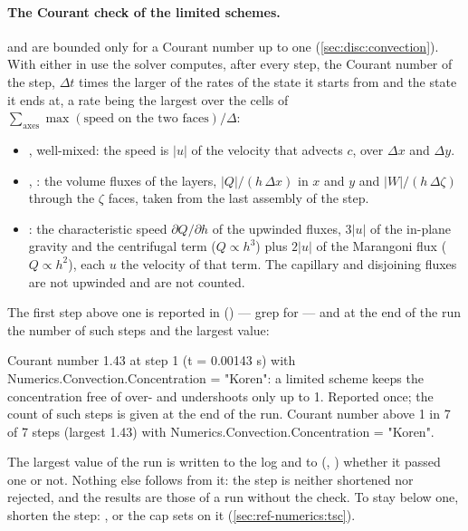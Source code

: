 \paragraph{The Courant check of the limited schemes.}  and
 are bounded only for a Courant number up to one
(\cref{sec:disc:convection}). With either in use the solver computes, after
every step, the Courant number of the step, $\Delta t$ times the larger of
the rates of the state it starts from and the state it ends at, a rate being the
largest over the cells of $\sum_\text{axes} \max(\text{speed on the two
faces})/\Delta$:
\begin{itemize}
  \item {}, well-mixed: the speed is $|u|$ of the velocity
    that advects $c$, over $\Delta x$ and $\Delta y$.
  \item {}, : the volume fluxes of the layers,
    $|Q|/(h\,\Delta x)$ in $x$ and $y$ and $|W|/(h\,\Delta\zeta)$ through the
    $\zeta$ faces, taken from the last assembly of the step.
  \item {}: the characteristic speed $\partial Q/\partial h$ of
    the upwinded fluxes, $3|u|$ of the in-plane gravity and the centrifugal
    term ($Q \propto h^3$) plus $2|u|$ of the Marangoni flux ($Q \propto
    h^2$), each $u$ the velocity of that term. The capillary and disjoining
    fluxes are not upwinded and are not counted.
\end{itemize}
The first step above one is reported in 
() --- grep for
 --- and at the end of the run the number of such
steps and the largest value:
\begin{plain}
Courant number 1.43 at step 1 (t = 0.00143 s) with Numerics.Convection.Concentration = "Koren": a limited scheme keeps the concentration free of over- and undershoots only up to 1. Reported once; the count of such steps is given at the end of the run.
Courant number above 1 in 7 of 7 steps (largest 1.43) with Numerics.Convection.Concentration = "Koren".
\end{plain}
The largest value of the run is written to the log and to 
(, ) whether it passed one
or not. Nothing else follows from it: the step is neither shortened nor
rejected, and the results are those of a run without the check. To stay
below one, shorten the step: , or the cap
 sets on it
(\cref{sec:ref-numerics:tsc}).

